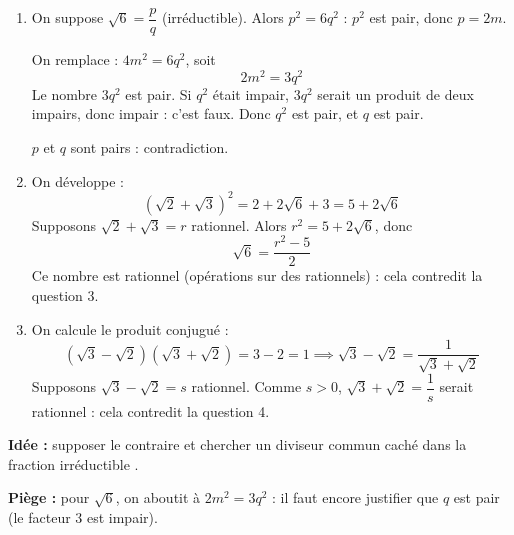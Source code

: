 \documentclass[12pt,a4paper]{article}
\begin{document}
\begin{corr}[title={Racines irrationnelles}, stars=4, source={Axiomaths}]
\begin{enumerate}
  \item On suppose $\sqrt6=\dfrac pq$ (irréductible). Alors $p^2=6q^2$ : $p^2$ est pair, donc $p=2m$.

  On remplace : $4m^2=6q^2$, soit
  \[2m^2=3q^2\]
  Le nombre $3q^2$ est pair. Si $q^2$ était impair, $3q^2$ serait un produit de deux impairs, donc impair : c'est faux. Donc $q^2$ est pair, et $q$ est pair.

  $p$ et $q$ sont pairs : contradiction. 

  \item On développe :
  \[(\sqrt2+\sqrt3)^2=2+2\sqrt6+3=5+2\sqrt6\]
  Supposons $\sqrt2+\sqrt3=r$ rationnel. Alors $r^2=5+2\sqrt6$, donc
  \[\sqrt6=\dfrac{r^2-5}2\]
  Ce nombre est rationnel (opérations sur des rationnels) : cela contredit la question 3.


  \item On calcule le produit conjugué :
  \[(\sqrt3-\sqrt2)(\sqrt3+\sqrt2)=3-2=1\implies\sqrt3-\sqrt2=\dfrac1{\sqrt3+\sqrt2}\]
  Supposons $\sqrt3-\sqrt2=s$ rationnel. Comme $s>0$, $\sqrt3+\sqrt2=\dfrac1s$ serait rationnel : cela contredit la question 4.

\end{enumerate}
\textbf{Idée :} supposer le contraire et chercher un diviseur commun caché dans la fraction \og irréductible \fg{}.

\textbf{Piège :} pour $\sqrt6$, on aboutit à $2m^2=3q^2$ : il faut encore justifier que $q$ est pair (le facteur $3$ est impair).
\end{corr}
\end{document}
